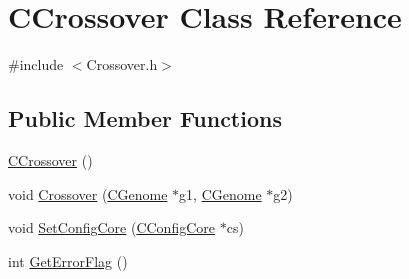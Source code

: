 \hypertarget{classCCrossover}{
\section{CCrossover Class Reference}
\label{classCCrossover}
}


{\ttfamily \#include $<$Crossover.h$>$}\subsection*{Public Member Functions}
\begin{DoxyCompactItemize}
\item 
\hyperlink{classCCrossover_a9877d88681846a002372d26fb450a1b8}{CCrossover} ()
\item 
void \hyperlink{classCCrossover_a56c755fbc976d04f42b65a31bde58426}{Crossover} (\hyperlink{classCGenome}{CGenome} $\ast$g1, \hyperlink{classCGenome}{CGenome} $\ast$g2)
\item 
void \hyperlink{classCCrossover_a71aa63e27a38f97b8f2032b38fd2d1a2}{SetConfigCore} (\hyperlink{classCConfigCore}{CConfigCore} $\ast$cs)
\item 
int \hyperlink{classCCrossover_a21aa060801ac66d4437213992869c46d}{GetErrorFlag} ()
\end{DoxyCompactItemize}
